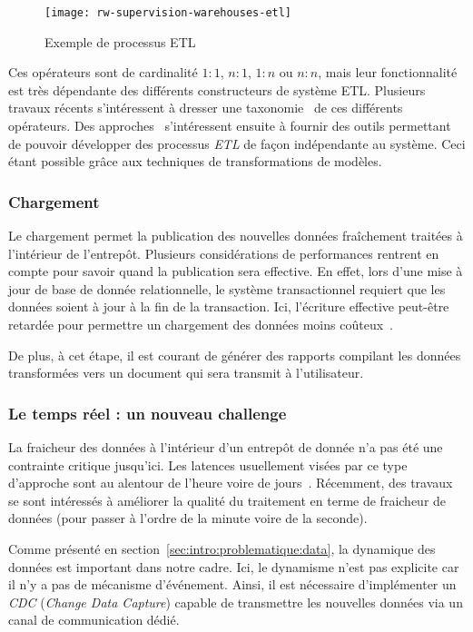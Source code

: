 \begin{figure}[ht]
    \centering
    \texttt{[image: rw-supervision-warehouses-etl]}
    \caption{Exemple de processus ETL}\label{fig:rw:supervision:warehouses:etl}
\end{figure}


Ces opérateurs sont de cardinalité $1\!\!:\!\!1$, $n\!\!:\!\!1$, $1\!\!:\!\!n$ ou $n\!\!:\!\!n$, mais leur fonctionnalité est très dépendante des différents constructeurs de système ETL. Plusieurs travaux récents s'intéressent à dresser une taxonomie~\cite{Vassiliadis:taxonomy} de ces différents opérateurs. Des approches~\cite{Akkaoui:etl,Trujilo:uml-etl} s'intéressent ensuite à fournir des outils permettant de pouvoir développer des processus \textit{ETL} de façon indépendante au système. Ceci étant possible grâce aux techniques de transformations de modèles.

\subsubsection{Chargement}
Le chargement permet la publication des nouvelles données fraîchement traitées à l'intérieur de l'entrepôt. Plusieurs considérations de performances rentrent en compte pour savoir quand la publication sera effective. En effet, lors d'une mise à jour de base de donnée relationnelle, le système transactionnel requiert que les données soient à jour à la fin de la transaction. Ici, l'écriture effective peut-être retardée pour permettre un chargement des données moins coûteux~\cite{Petit:historical}.

De plus, à cet étape, il est courant de générer des rapports compilant les données transformées vers un document qui sera transmit à l'utilisateur.

\subsubsection{Le temps réel : un nouveau challenge}
La fraicheur des données à l'intérieur d'un entrepôt de donnée n'a pas été une contrainte critique jusqu'ici. Les latences usuellement visées par ce type d'approche sont au alentour de l'heure voire de jours~\cite{Oracle:realtimedw}. Récemment, des travaux se sont intéressés à améliorer la qualité du traitement en terme de fraicheur de données (pour passer à l'ordre de la minute voire de la seconde).

Comme présenté en section~\ref{sec:intro:problematique:data}, la dynamique des données est important dans notre cadre. Ici, le dynamisme n'est pas explicite car il n'y a pas de mécanisme d'événement. Ainsi, il est nécessaire d'implémenter un \textit{CDC} (\textit{Change Data Capture}) capable de transmettre les nouvelles données via un canal de communication dédié.

